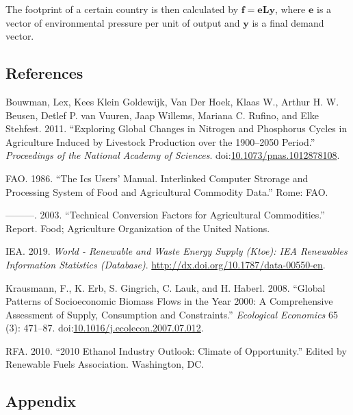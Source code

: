 \documentclass[]{article}
\begin{document}
The footprint of a certain country is then calculated by
\(\mathbf{f}=\mathbf{e}\mathbf{L}\mathbf{y}\), where \(\mathbf{e}\) is a
vector of environmental pressure per unit of output and \(\mathbf{y}\)
is a final demand vector.

\subsection{References}\label{references}

\hypertarget{refs}{}
\hypertarget{ref-Bouwman2011}{}
Bouwman, Lex, Kees Klein Goldewijk, Van Der Hoek, Klaas W., Arthur H. W.
Beusen, Detlef P. van Vuuren, Jaap Willems, Mariana C. Rufino, and Elke
Stehfest. 2011. ``Exploring Global Changes in Nitrogen and Phosphorus
Cycles in Agriculture Induced by Livestock Production over the
1900--2050 Period.'' \emph{Proceedings of the National Academy of
Sciences}.
doi:\href{https://doi.org/10.1073/pnas.1012878108}{10.1073/pnas.1012878108}.

\hypertarget{ref-FAO1986}{}
FAO. 1986. ``The Ics Users' Manual. Interlinked Computer Strorage and
Processing System of Food and Agricultural Commodity Data.'' Rome: FAO.

\hypertarget{ref-FAO2003}{}
---------. 2003. ``Technical Conversion Factors for Agricultural
Commodities.'' Report. Food; Agriculture Organization of the United
Nations.

\hypertarget{ref-IEA2019}{}
IEA. 2019. \emph{World - Renewable and Waste Energy Supply (Ktoe): IEA
Renewables Information Statistics (Database)}.
\url{http://dx.doi.org/10.1787/data-00550-en}.

\hypertarget{ref-Krausmann2008}{}
Krausmann, F., K. Erb, S. Gingrich, C. Lauk, and H. Haberl. 2008.
``Global Patterns of Socioeconomic Biomass Flows in the Year 2000: A
Comprehensive Assessment of Supply, Consumption and Constraints.''
\emph{Ecological Economics} 65 (3): 471--87.
doi:\href{https://doi.org/10.1016/j.ecolecon.2007.07.012}{10.1016/j.ecolecon.2007.07.012}.

\hypertarget{ref-RFA2010}{}
RFA. 2010. ``2010 Ethanol Industry Outlook: Climate of Opportunity.''
Edited by Renewable Fuels Association. Washington, DC.

\pagebreak

\subsection{Appendix}\label{appendix}
\end{document}
